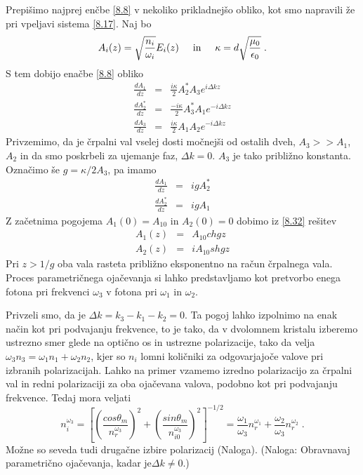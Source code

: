 \documentclass[11pt,fleqn]{book} %
\begin{document}
Prepišimo najprej enčbe \ref{8.8} v nekoliko prikladnejšo obliko,
kot smo napravili že pri vpeljavi sistema \ref{8.17}. Naj bo 
\begin{equation}
A_{i}(z)=\sqrt{\frac{n_{i}}{\omega_{i}}}E_{i}(z)\hskip0.5cm\mbox{in}
\hskip0.5cm\kappa=d\sqrt{\frac{\mu_{0}}{\epsilon_{0}}}\;.\label{8.30}
\end{equation}
 S tem dobijo enačbe \ref{8.8} obliko 
\begin{eqnarray}
\frac{dA_{1}}{dz} & = & \frac{i\kappa}{2}A_{2}^{\ast}A_{3}e^{i\Delta kz}\nonumber \\
\frac{dA_{2}^{\ast}}{dz} & = & \frac{-i\kappa}{2}A_{3}^{\ast}A_{1}e^{-i\Delta kz}\nonumber \\
\frac{dA_{3}}{dz} & = & \frac{i\kappa}{2}A_{1}A_{2}e^{-i\Delta kz}
\end{eqnarray}
 Privzemimo, da je črpalni val vselej dosti močnejši od ostalih dveh,
$A_{3}>>A_{1}$, $A_{2}$ in da smo poskrbeli za ujemanje faz, $\Delta k=0$.
$A_{3}$ je tako približno konstanta. Označimo še $g=\kappa/2A_{3}$,
pa imamo 
\begin{eqnarray}
\frac{dA_{1}}{dz} & = & igA_{2}^{\ast}\nonumber \\
\frac{dA_{2}^{\ast}}{dz} & = & igA_{1}
\end{eqnarray}
 Z začetnima pogojema $A_{1}(0)=A_{10}$ in $A_{2}(0)=0$ dobimo iz
\ref{8.32} rešitev 
\begin{eqnarray}
A_{1}(z) & = & A_{10}chgz\nonumber \\
A_{2}(z) & = & iA_{10}shgz
\end{eqnarray}
 Pri $z>1/g$ oba vala rasteta približno eksponentno na račun črpalnega
vala. Proces parametričnega ojačevanja si lahko predstavljamo kot
pretvorbo enega fotona pri frekvenci $\omega_{3}$ v fotona pri $\omega_{1}$
in $\omega_{2}$.

Privzeli smo, da je $\Delta k=k_{3}-k_{1}-k_{2}=0$. Ta pogoj lahko
izpolnimo na enak način kot pri podvajanju frekvence, to je tako,
da v dvolomnem kristalu izberemo ustrezno smer glede na optično os
in ustrezne polarizacije, tako da velja $\omega_{3}n_{3}=\omega_{1}n_{1}+\omega_{2}n_{2}$,
kjer so $n_{i}$ lomni količniki za odgovarjajoče valove pri izbranih
polarizacijah. Lahko na primer vzamemo izredno polarizacijo za črpalni
val in redni polarizaciji za oba ojačevana valova, podobno kot pri
podvajanju frekvence. Tedaj mora veljati 
\begin{equation}
n_{i}^{\omega_{3}}=\left[\left(\frac{cos\theta_{m}}{n_{r}^{\omega_{3}}}\right)^{2}
+\left(\frac{sin\theta_{m}}{n_{i0}^{\omega_{3}}}\right)^{2}\right]^{-1/2}=
\frac{\omega_{1}}{\omega_{3}}n_{r}^{\omega_{1}}+\frac{\omega_{2}}{\omega_{3}}n_{r}^{\omega_{2}}\;.\label{8.34}
\end{equation}
 Možne so seveda tudi drugačne izbire polarizacij (Naloga). (Naloga:
Obravnavaj parametrično ojačevanja, kadar je$\Delta k\neq0$.)
\end{document}
